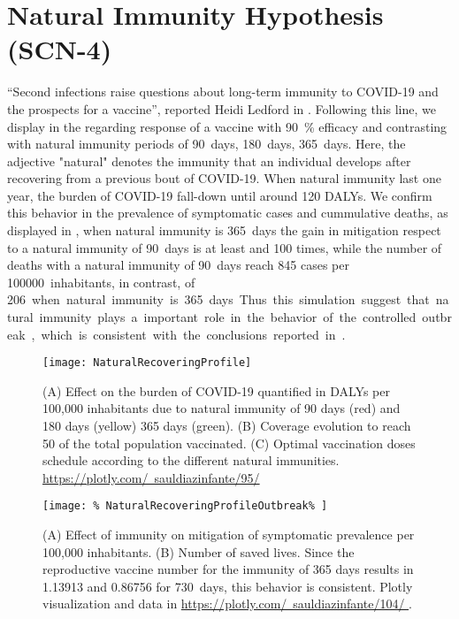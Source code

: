 \section*{Natural Immunity Hypothesis (SCN-4)}
%
    ``Second infections raise questions about long-term immunity to
    COVID-19 and the prospects for a vaccine'', reported
    Heidi Ledford in \cite{Ledford2020b}. Following this line, we
    display in  the regarding response
    of a vaccine with \SI{90}{\percent} efficacy and
    contrasting with  natural immunity periods of
    \SI{90}{days}, \SI{180}{days}, \SI{365}{days}. Here,
    the adjective "natural" denotes the immunity that an individual
    develops after recovering from a previous bout of COVID-19. When natural
    immunity last one year, the burden of COVID-19 fall-down until
    around 120 DALYs. We confirm this behavior in the prevalence of
    symptomatic cases and cummulative deaths, as displayed in
    , when
    natural immunity is \SI{365}{days} the gain in mitigation respect to a
    natural immunity of \SI{90}{days} is at least and 100 times, while the
    number of deaths with a natural immunity of \SI{90}{days} reach 845 cases
    per \SI{100000}{inhabitants}, in contrast, of \SI{206} when natural
    immunity is \SI{365}{days}. Thus this simulation suggest that natural
    immunity plays a important role in the behavior of the controlled
    outbreak, which is consistent with the conclusions reported in
    \cite{Jeyanathan2020}.
%
    \begin{figure*}[tbh!]
        \centering
        \texttt{[image: NaturalRecoveringProfile]}
        \caption[Effect of natural immunity on the burden of COVID-19]{
            (A) Effect on the burden of COVID-19 quantified in DALYs per
            100,000 inhabitants due to natural immunity of 90 days (red) and
            180 days (yellow) 365 days (green).
            (B) Coverage evolution to reach \SI{50}{\per} of the total
            population vaccinated.
            (C) Optimal vaccination doses schedule according to the different
            natural immunities.
            \href{https://plotly.com/~sauldiazinfante/95/}{%
                https://plotly.com/~sauldiazinfante/95/}
        }
        \label{fig:natural_recovering_profile}
    \end{figure*}
%
    \begin{figure*}[h!]
        \centering
        \texttt{[image: \%
            NaturalRecoveringProfileOutbreak\%
        ]}
        \caption[Vaccine induced immunity profile.]{
            (A) Effect of  immunity on mitigation of
            symptomatic prevalence per 100,000 inhabitants.
            (B) Number of saved lives. Since the reproductive vaccine number
            for the immunity of 365 days results in \num{1.13913} and
            \num{0.86756} for \SI{730}{days}, this behavior is consistent.
            Plotly visualization and data in
            \href{https://plotly.com/~sauldiazinfante/104/}{%
                https://plotly.com/~sauldiazinfante/104/
            }.
        }
        \label{fig:natural_recovering_outbreak}
    \end{figure*}